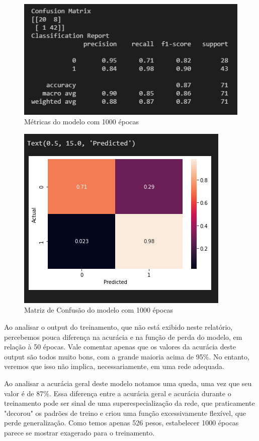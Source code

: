 \documentclass[12pt]{article}
\begin{document}
\begin{figure}[H]
	\centering
	\includegraphics[width=0.7\linewidth]{Imagens/1000epocas/metricas1000epocas}
	\caption{Métricas do modelo com 1000 épocas}
	\label{fig:metricas1000epocas}
\end{figure}
\begin{figure}[H]
	\centering
	\includegraphics[width=0.7\linewidth]{Imagens/1000epocas/confusao1000epocas}
	\caption{Matriz de Confusão do modelo com 1000 épocas}
	\label{fig:confusao1000epocas}
\end{figure}

Ao analisar o output do treinamento, que não está exibido neste relatório, percebemos pouca diferença na acurácia e na função de perda do modelo, em relação à 50 épocas. Vale comentar apenas que os valores da acurácia deste output são todos muito bons, com a grande maioria acima de 95\%. No entanto, veremos que isso não implica, necessariamente, em uma rede adequada.

Ao analisar a acurácia geral deste modelo notamos uma queda, uma vez que seu valor é de 87\%. Essa diferença entre a acurácia geral e acurácia durante o treinamento pode ser sinal de uma superespecialização da rede, que praticamente "decorou" os padrões de treino e criou uma função excessivamente flexível, que perde generalização. Como temos apenas 526 pesos, estabelecer 1000 épocas parece se mostrar exagerado para o treinamento.
\end{document}
